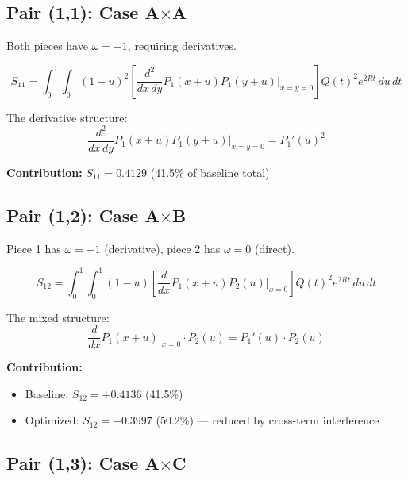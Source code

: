 \documentclass[11pt]{article}
\begin{document}
\subsection{Pair (1,1): Case A$\times$A}

Both pieces have $\omega = -1$, requiring derivatives.

\begin{equation}
S_{11} = \int_0^1 \int_0^1 (1-u)^2 \left[\frac{d^2}{dx\,dy} P_1(x+u) P_1(y+u) \Big|_{x=y=0}\right] Q(t)^2 e^{2Rt} \, du\, dt
\end{equation}

The derivative structure:
\begin{equation}
\frac{d^2}{dx\,dy} P_1(x+u) P_1(y+u) \Big|_{x=y=0} = P_1'(u)^2
\end{equation}

\textbf{Contribution:} $S_{11} = 0.4129$ (41.5\% of baseline total)

\subsection{Pair (1,2): Case A$\times$B}

Piece 1 has $\omega = -1$ (derivative), piece 2 has $\omega = 0$ (direct).

\begin{equation}
S_{12} = \int_0^1 \int_0^1 (1-u) \left[\frac{d}{dx} P_1(x+u) P_2(u) \Big|_{x=0}\right] Q(t)^2 e^{2Rt} \, du\, dt
\end{equation}

The mixed structure:
\begin{equation}
\frac{d}{dx} P_1(x+u) \Big|_{x=0} \cdot P_2(u) = P_1'(u) \cdot P_2(u)
\end{equation}

\textbf{Contribution:} 
\begin{itemize}
\item Baseline: $S_{12} = +0.4136$ (41.5\%)
\item Optimized: $S_{12} = +0.3997$ (50.2\%) --- reduced by cross-term interference
\end{itemize}

\subsection{Pair (1,3): Case A$\times$C}
\end{document}
